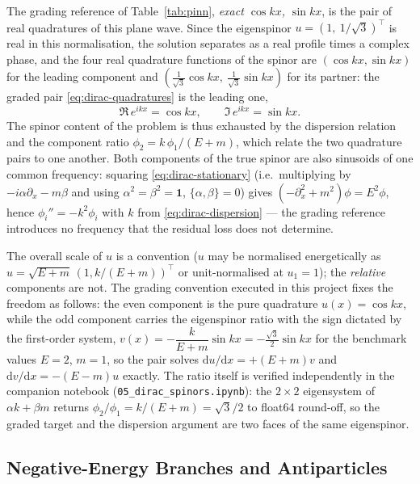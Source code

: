 The grading reference of Table~\ref{tab:pinn}, \emph{exact $\cos kx$,
$\sin kx$}, is the pair of real quadratures of this plane wave. Since the
eigenspinor $u = (1,\ 1/\sqrt{3})^{\top}$ is real in this normalisation, the
solution separates as a real profile times a complex phase, and the four
real quadrature functions of the spinor are
$(\cos kx, \sin kx)$ for the leading component and
$(\tfrac{1}{\sqrt{3}}\cos kx,\ \tfrac{1}{\sqrt{3}}\sin kx)$ for its partner:
the graded pair \eqref{eq:dirac-quadratures} is the leading one,
\begin{equation}
\Re\, e^{ikx} = \cos kx,
\qquad
\Im\, e^{ikx} = \sin kx.
\label{eq:dirac-quadratures}
\end{equation}
The spinor content of the problem is thus exhausted by the dispersion
relation and the component ratio $\phi_2 = k\,\phi_1/(E+m)$, which relate
the two quadrature pairs to one another. Both components of the true spinor
are also sinusoids of one common frequency: squaring
\eqref{eq:dirac-stationary} (i.e.\ multiplying by
$-i\alpha\partial_x - m\beta$ and using
$\alpha^{2} = \beta^{2} = \mathbf{1}$, $\{\alpha,\beta\} = 0$) gives
$(-\partial_x^{2} + m^{2})\phi = E^{2}\phi$, hence
$\phi_i'' = -k^{2}\phi_i$ with $k$ from \eqref{eq:dirac-dispersion} --- the
grading reference introduces no frequency that the residual loss does not
determine.

\begin{remark}
\label{rem:dirac-normalisation}
The overall scale of $u$ is a convention ($u$ may be normalised energetically
as $u = \sqrt{E+m}\,(1, k/(E+m))^{\top}$ or unit-normalised at $u_1 = 1$);
the \emph{relative} components are not. The grading convention executed in
this project fixes the freedom as follows: the even component is the pure
quadrature $u(x)=\cos kx$, while the odd component carries the eigenspinor
ratio with the sign dictated by the first-order system,
$v(x)=-\dfrac{k}{E+m}\sin kx=-\tfrac{\sqrt3}{2}\sin kx$ for the benchmark
values $E=2$, $m=1$, so the pair solves
$\mathrm{d}u/\mathrm{d}x=+(E{+}m)v$ and
$\mathrm{d}v/\mathrm{d}x=-(E{-}m)u$ exactly.  The ratio itself is verified
independently in the companion notebook
(\texttt{05\_dirac\_spinors.ipynb}): the $2\times2$ eigensystem of
$\alpha k+\beta m$ returns $\phi_2/\phi_1=k/(E+m)=\sqrt3/2$ to float64
round-off, so the graded target and the dispersion argument are two faces
of the same eigenspinor.
\end{remark}

\subsection{Negative-Energy Branches and Antiparticles}
\label{sec:dirac-antiparticles}

